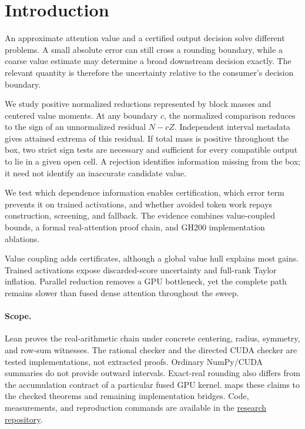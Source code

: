 \section{Introduction}
\label{sec:introduction}

An approximate attention value and a certified output decision solve different
problems. A small absolute error can still cross a rounding boundary, while
a coarse value estimate may determine a broad downstream decision exactly.
The relevant quantity is therefore the uncertainty relative to the consumer's
decision boundary.

We study positive normalized reductions represented by block masses and
centered value moments. At any boundary $c$, the normalized comparison reduces
to the sign of an unnormalized residual $N-cZ$. Independent interval metadata
gives attained extrema of this residual. If total mass is positive throughout
the box, two strict sign tests are necessary and sufficient for every compatible
output to lie in a given open cell. A rejection identifies information missing from the box;
it need not identify an inaccurate candidate value.

We test which dependence information enables certification, which error term
prevents it on trained activations, and whether avoided token work repays
construction, screening, and fallback. The evidence combines value-coupled
bounds, a formal real-attention proof chain, and GH200 implementation ablations.

Value coupling adds certificates, although a global value hull explains most
gains. Trained activations expose discarded-score uncertainty and full-rank
Taylor inflation. Parallel reduction removes a GPU bottleneck, yet the
complete path remains slower than fused dense attention throughout the sweep.

\paragraph{Scope.}
Lean proves the real-arithmetic chain under concrete centering, radius,
symmetry, and row-sum witnesses. The rational checker and the directed CUDA
checker are tested implementations, not extracted proofs. Ordinary
NumPy/CUDA summaries do not provide outward intervals. Exact-real rounding
also differs from the accumulation contract of a particular fused GPU kernel.
 maps these claims to the checked theorems and remaining
implementation bridges. Code, measurements, and reproduction commands are
available in the \href{https://github.com/SamMausberg/contracted-moment-kernels}{research repository}.


